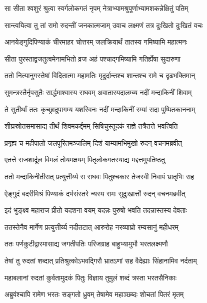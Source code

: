 \twolineshloka
{सा सीता श्वशुरं श्रुत्वा स्वर्गलोकगतं नृपम्}
{नेत्राभ्यामश्रुपूर्णाभ्यामशकन्नेक्षितुं पतिम्} %

\twolineshloka
{सान्त्वयित्वा तु तां रामो रुदन्तीं जनकात्मजाम्}
{उवाच लक्ष्मणं तत्र दुःखितो दुःखितं वचः} %

\twolineshloka
{आनयेङ्गुदिपिण्याकं चीरमाहर चोत्तरम्}
{जलक्रियार्थं तातस्य गमिष्यामि महात्मनः} %

\twolineshloka
{सीता पुरस्ताद्व्रजतुत्वमेनामभितो व्रज}
{अहं पश्चाद्गमिष्यामि गतिर्ह्येषा सुदारुणा} %

\twolineshloka
{ततो नित्यानुगस्तेषां विदितात्मा महामतिः}
{मृदुर्दान्तश्च शान्तश्च रामे च दृढभक्तिमान्} %

\twolineshloka
{सुमन्त्रस्तैर्नृपसुतैः सार्द्धमाश्वास्य राघवम्}
{अवातारयदालम्ब्य नदीं मन्दाकिनीं शिवाम्} %

\twolineshloka
{ते सुतीर्थां ततः कृच्छ्रादुपागम्य यशस्विनः}
{नदीं मन्दाकिनीं रम्यां सदा पुष्पितकाननाम्} %

\twolineshloka
{शीघ्रस्रोतसमासाद्य तीर्थं शिवमकर्द्दमम्}
{सिषिचुस्तूदकं राज्ञे तत्रैतत्ते भवत्विति} %

\twolineshloka
{प्रगृह्य च महीपालो जलपूरितमञ्जलिम्}
{दिशं याम्यामभिमुखो रुदन् वचनमब्रवीत्} %

\twolineshloka
{एतत्ते राजशार्दूल विमलं तोयमक्षयम्}
{पितृलोकगतस्याद्य मद्दत्तमुपतिष्ठतु} %

\twolineshloka
{ततो मन्दाकिनीतीरात् प्रत्युत्तीर्य्य स राघवः}
{पितुश्चकार तेजस्वी निवापं भ्रातृभिः सह} %

\twolineshloka
{ऐङ्गुदं बदरीमिश्रं पिण्याकं दर्भसंस्तरे}
{न्यस्य रामः सुदुःखार्त्तो रुदन् वचनमब्रवीत्} %

\twolineshloka
{इदं भुङ्क्ष्व महाराज प्रीतो यदशना वयम्}
{यदन्नः पुरुषो भवति तदन्नास्तस्य देवताः} %

\twolineshloka
{ततस्तेनैव मार्गेण प्रत्युत्तीर्य्य नदीतटात्}
{आरुरोह नरव्याघ्रो रम्यसानुं महीधरम्} %

\twolineshloka
{ततः पर्णकुटीद्वारमासाद्य जगतीपतिः}
{परिजग्राह बाहुभ्यामुभौ भरतलक्ष्मणौ} %

\twolineshloka
{तेषां तु रुदतां शब्दात् प्रतिश्रुत्कोऽभवद्गिरौ}
{भ्रातऽणां सह वैदेह्याः सिंहानामिव नर्दताम्} %

\twolineshloka
{महाबलानां रुदतां कुर्वतामुदकं पितुः}
{विज्ञाय तुमुलं शब्दं त्रस्ता भरतसैनिकाः} %

\twolineshloka
{अब्रुवंश्चापि रामेण भरतः सङ्गतो ध्रुवम्}
{तेषामेव महाञ्छब्दः शोचतां पितरं मृतम्} %

